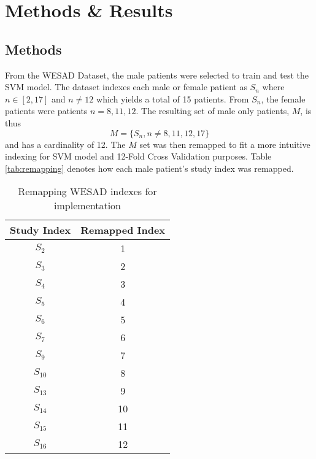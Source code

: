 \section{Methods \& Results}
\label{sec:methods-results}

\subsection{Methods}
\label{sec:methods}

From the WESAD Dataset, the male patients were selected to train and test the SVM model. 
The dataset indexes each male or female patient as $S_n$ where $n \in [2,17]$ and 
$n \ne 12$ which yields a total of 15 patients. From $S_n$, the female patients were patients 
$n=8,11,12$. The resulting set of male only patients, $M$, is thus 
$$ M = \{S_n,n \ne 8,11,12,17\} $$
and has a cardinality of 12. The $M$ set was then remapped to fit a more intuitive 
indexing for SVM model and 12-Fold Cross Validation purposes. Table \ref{tab:remapping}
denotes how each male patient's study index was remapped. 

\begin{table}[h!]
\centering
\begin{tabular}{||c c||} 
\hline
Study Index & Remapped Index  \\ [0.5ex] 
\hline \hline
$S_2$ & 1  \\ 
\hline
$S_3$ & 2  \\ 
\hline
$S_4$ & 3  \\ 
\hline
$S_5$ & 4  \\ 
\hline
$S_6$ & 5  \\ 
\hline
$S_7$ & 6  \\ 
\hline
$S_9$ & 7  \\ 
\hline
$S_{10}$ & 8  \\ 
\hline
$S_{13}$ & 9  \\ 
\hline
$S_{14}$ & 10  \\ 
\hline
$S_{15}$ & 11  \\ 
\hline 
$S_{16}$ & 12  \\ 
\hline 
\hline
\end{tabular}
\caption{Remapping WESAD indexes for implementation}
\label{table:reampping}
\end{table}


